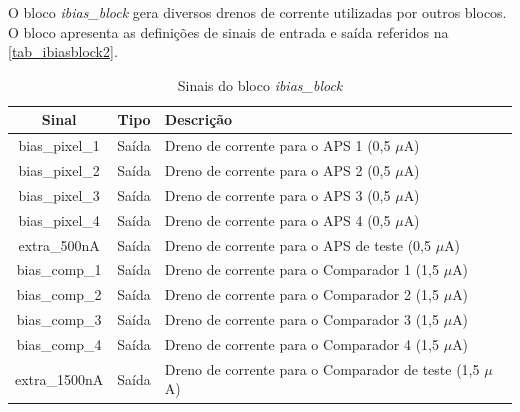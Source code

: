 \renewcommand{\NomeBloco}{\emph{ibias\_block}}
\renewcommand{\NomeBlocoA}{ibiasblock}
\renewcommand{\NomePTab}{tab_\NomeBlocoA}
\renewcommand{\NomeSTab}{tab_\NomeBlocoA2}
\renewcommand{\NomePFig}{fig_\NomeBlocoA}
\renewcommand{\NomeSFig}{fig_\NomeBlocoA2}
\renewcommand{\NomeTTab}{tab_\NomeBlocoA3}

O bloco \NomeBloco{} gera diversos drenos de corrente utilizadas por outros blocos. O bloco apresenta as defini{\c c}\~oes de sinais de entrada e sa\'ida referidos na \autoref{\NomeSTab}.

\begin{table}[htbp]
\caption{Sinais do bloco \NomeBloco}
\label{\NomeSTab}
\centering
\begin{tabular}{ccl}

    \toprule
    Sinal & Tipo    & Descri{\c c}\~ao      \\
    \midrule \midrule
    bias\_pixel\_1   & Sa\'ida   & Dreno de corrente para o APS 1 (0,5 $\mu$A) \\
    \midrule
    bias\_pixel\_2   & Sa\'ida   & Dreno de corrente para o APS 2 (0,5 $\mu$A) \\
    \midrule
    bias\_pixel\_3   & Sa\'ida   & Dreno de corrente para o APS 3 (0,5 $\mu$A) \\
    \midrule
    bias\_pixel\_4   & Sa\'ida   & Dreno de corrente para o APS 4 (0,5 $\mu$A) \ \\
    extra\_500nA   & Sa\'ida   & Dreno de corrente para o APS de teste (0,5 $\mu$A) \ \\
    \midrule
    bias\_comp\_1   & Sa\'ida   & Dreno de corrente para o Comparador 1 (1,5 $\mu$A) \ \\
    \midrule
    bias\_comp\_2   & Sa\'ida   & Dreno de corrente para o Comparador 2 (1,5 $\mu$A) \ \\
    \midrule
    bias\_comp\_3   & Sa\'ida   & Dreno de corrente para o Comparador 3 (1,5 $\mu$A) \\
    \midrule
    bias\_comp\_4   & Sa\'ida   & Dreno de corrente para o Comparador 4 (1,5 $\mu$A) \\
    extra\_1500nA   & Sa\'ida   & Dreno de corrente para o Comparador de teste (1,5 $\mu$A) \ \\
    \bottomrule
\end{tabular}
\end{table}

